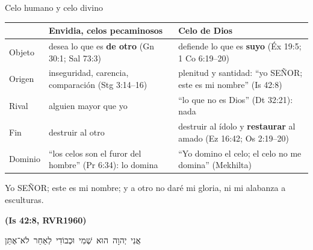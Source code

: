 \documentclass[hyperref={bookmarks=false},aspectratio=169]{beamer}
\newcommand{\heb}[1]{\mbox{\foreignlanguage{hebrew}{#1}}}
\newcommand{\SENOR}{S{\fontsize{0.78em}{1em}\selectfont EÑOR}}
\newcommand{\fuente}[1]{\par\hfill{\upshape\bfseries\footnotesize\textcolor{azul}{#1}}}
\newcommand{\destacar}[1]{\textbf{\textcolor{azul}{#1}}}
\begin{document}
\begin{frame}{Celo humano y celo divino}
\scriptsize\renewcommand{\arraystretch}{1.2}
\begin{tabular}{@{}>{\RaggedRight\arraybackslash}p{2.3cm}>{\RaggedRight\arraybackslash}p{4.5cm}>{\RaggedRight\arraybackslash}p{5.0cm}@{}}
\toprule
 & \textbf{Envidia, celos pecaminosos} & \textbf{Celo de Dios} \\ \midrule
Objeto & desea lo que es \destacar{de otro} (Gn 30:1; Sal 73:3) & defiende lo que es \destacar{suyo} (Éx 19:5; 1 Co 6:19--20) \\
Origen & inseguridad, carencia, comparación (Stg 3:14--16) & plenitud y santidad: ``yo \SENOR; este es mi nombre'' (Is 42:8) \\
Rival & alguien mayor que yo & ``lo que no es Dios'' (Dt 32:21): nada \\
Fin & destruir al otro & destruir al ídolo y \destacar{restaurar} al amado (Ez 16:42; Os 2:19--20) \\
Dominio & ``los celos son el furor del hombre'' (Pr 6:34): lo domina & ``Yo domino el celo; el celo no me domina'' (Mekhilta) \\
\bottomrule
\end{tabular}\par\medskip
\begin{cita}Yo \SENOR; este es mi nombre; y a otro no daré mi gloria, ni mi alabanza a esculturas.\fuente{(Is 42:8, RVR1960)}\end{cita}
\centering\heb{אֲנִי יְהוָה הוּא שְׁמִי וּכְבוֹדִי לְאַחֵר לֹא־אֶתֵּן}
\end{frame}
\end{document}
